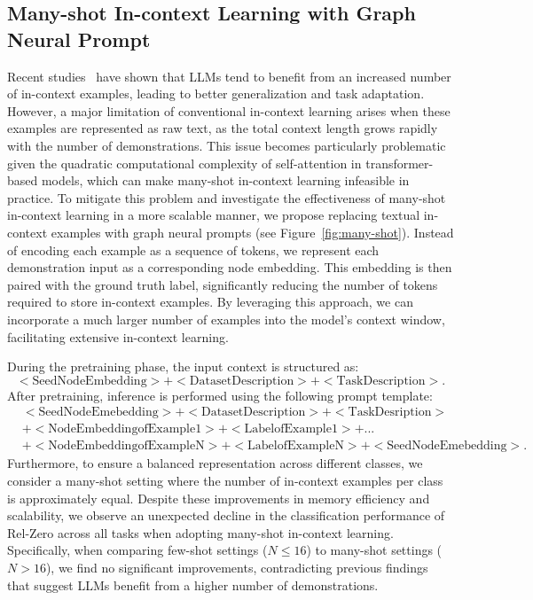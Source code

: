 \documentclass[11pt]{article}
\begin{document}
\subsection{Many-shot In-context Learning with Graph Neural Prompt}
\label{app:many-shot}
Recent studies~\citep{agarwal2025many} have shown that LLMs tend to benefit from an increased number of in-context examples, leading to better generalization and task adaptation. However, a major limitation of conventional in-context learning arises when these examples are represented as raw text, as the total context length grows rapidly with the number of demonstrations. This issue becomes particularly problematic given the quadratic computational complexity of self-attention in transformer-based models, which can make many-shot in-context learning infeasible in practice. To mitigate this problem and investigate the effectiveness of many-shot in-context learning in a more scalable manner, we propose replacing textual in-context examples with graph neural prompts (see Figure~\ref{fig:many-shot}). Instead of encoding each example as a sequence of tokens, we represent each demonstration input as a corresponding node embedding. This embedding is then paired with the ground truth label, significantly reducing the number of tokens required to store in-context examples. By leveraging this approach, we can incorporate a much larger number of examples into the model's context window, facilitating extensive in-context learning.

During the pretraining phase, the input context is structured as:
\begin{equation}
    \mathrm{<Seed Node Embedding> + <Dataset Description> + <Task Description>}.
\end{equation}
After pretraining, inference is performed using the following prompt template:
\begin{equation}
\begin{split}
    & \mathrm{ <Seed Node Emebedding> + <Dataset Description> + <Task Desription>}\\
    & \mathrm{+ <Node Embedding of Example 1> + <Label of Example 1> + ...}\\
    & \mathrm{+ <Node Embedding of Example N> + <Label of Example N> + <Seed Node Emebedding>}.
\end{split}
\end{equation}
Furthermore, to ensure a balanced representation across different classes, we consider a many-shot setting where the number of in-context examples per class is approximately equal. Despite these improvements in memory efficiency and scalability, we observe an unexpected decline in the classification performance of Rel-Zero across all tasks when adopting many-shot in-context learning. Specifically, when comparing few-shot settings ($N \leq 16$) to many-shot settings ($N > 16$), we find no significant improvements, contradicting previous findings that suggest LLMs benefit from a higher number of demonstrations.
\end{document}
